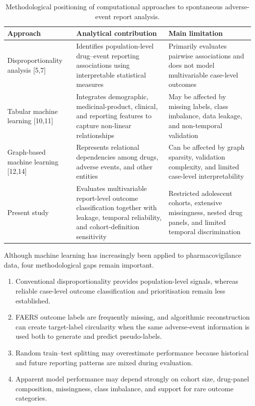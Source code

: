 \documentclass[10pt]{article}
\begin{document}
\begin{table}[t]
\caption{Methodological positioning of computational approaches to spontaneous adverse-event report analysis.}
\label{tab:method_compare}
\centering\small\setlength{\tabcolsep}{5pt}
\begin{tabularx}{\textwidth}{|>{\raggedright\arraybackslash\hsize=0.7\hsize}X|>{\raggedright\arraybackslash\hsize=1.0\hsize}X|>{\raggedright\arraybackslash\hsize=1.3\hsize}X|}
\hline
\textbf{Approach} & \textbf{Analytical contribution} & \textbf{Main limitation} \\
\hline
Disproportionality analysis [5,7] & Identifies population-level drug--event reporting associations using interpretable statistical measures & Primarily evaluates pairwise associations and does not model multivariable case-level outcomes \\
\hline
Tabular machine learning [10,11] & Integrates demographic, medicinal-product, clinical, and reporting features to capture non-linear relationships & May be affected by missing labels, class imbalance, data leakage, and non-temporal validation \\
\hline
Graph-based machine learning [12,14] & Represents relational dependencies among drugs, adverse events, and other entities & Can be affected by graph sparsity, validation complexity, and limited case-level interpretability \\
\hline
Present study & Evaluates multivariable report-level outcome classification together with leakage, temporal reliability, and cohort-definition sensitivity & Restricted adolescent cohorts, extensive missingness, nested drug panels, and limited temporal discrimination \\
\hline
\end{tabularx}
\end{table}

Although machine learning has increasingly been applied to pharmacovigilance data, four methodological gaps remain important. 
\begin{enumerate}
\item Conventional disproportionality provides population-level signals, whereas reliable case-level outcome classification and prioritisation remain less established. 
\item FAERS outcome labels are frequently missing, and algorithmic reconstruction can create target-label circularity when the same adverse-event information is used both to generate and predict pseudo-labels. 
\item Random train--test splitting may overestimate performance because historical and future reporting patterns are mixed during evaluation. 
\item Apparent model performance may depend strongly on cohort size, drug-panel composition, missingness, class imbalance, and support for rare outcome categories.
\end{enumerate}
\end{document}
